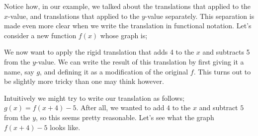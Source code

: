 \documentclass{ximera}
\begin{document}
    Notice how, in our example, we talked about the translations that applied to the $x$-value, and translations that applied to the $y$-value separately. This separation is made even more clear when we write the translation in functional notation. Let's consider a new function $f(x)$ whose graph is;

    \begin{minipage}{\textwidth}
        \begin{center}
        \end{center}
    \end{minipage}
    
    We now want to apply the rigid translation that adds 4 to the $x$ and subtracts 5 from the $y$-value. We can write the result of this translation by first giving it a name, say $g$, and defining it as a modification of the original $f$. This turns out to be slightly more tricky than one may think however. 
    
    Intuitively we might try to write our translation as follows; $g(x) = f(x+4) - 5$. After all, we wanted to add $4$ to the $x$ and subtract $5$ from the $y$, so this seems pretty reasonable. Let's see what the graph $f(x+4) - 5$ looks like.
    
    \begin{minipage}{\textwidth}
        \begin{center}
        \end{center}
    \end{minipage}
    
\end{document}
